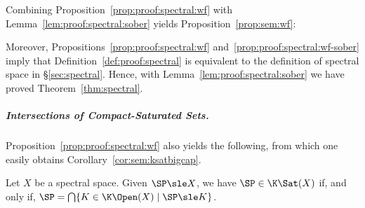 Combining Proposition~\ref{prop:proof:spectral:wf}
with Lemma~\ref{lem:proof:spectral:sober}
yields Proposition~\ref{prop:sem:wf}:

\PropWellFilt*

Moreover, Propositions~\ref{prop:proof:spectral:wf}
and~\ref{prop:proof:spectral:wf-sober}
imply that Definition~\ref{def:proof:spectral}
is equivalent to 
the definition of spectral space in \S\ref{sec:spectral}.
Hence, with Lemma~\ref{lem:proof:spectral:sober}
we have proved Theorem~\ref{thm:spectral}.

\ThmScottSpectral*

\subparagraph*{Intersections of Compact-Saturated Sets.}

Proposition~\ref{prop:proof:spectral:wf} also yields the following,
from which one easily obtains Corollary~\ref{cor:sem:ksatbigcap}.

\begin{lemma}
\label{lem:proof:spectral:ksat}
Let $X$ be a spectral space.
Given $\SP \sle X$,
we have $\SP \in \K\Sat(X)$
if, and only if,
$\SP = \bigcap \{ K \in \K\Open(X) \mid \SP \sle K\}$.
\end{lemma}



